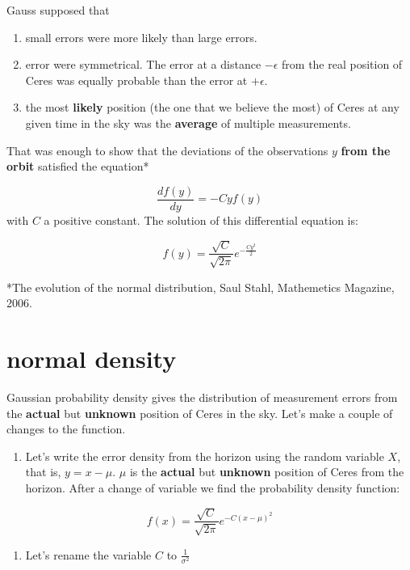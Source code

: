 \documentclass[
]{book}
\providecommand{\tightlist}{%
  \setlength{\itemsep}{0pt}\setlength{\parskip}{0pt}}
\begin{document}
Gauss supposed that

\begin{enumerate}
\def\labelenumi{\arabic{enumi})}
\item
  small errors were more likely than large errors.
\item
  error were symmetrical. The error at a distance \(-\epsilon\) from the real position of Ceres was equally probable than the error at \(+\epsilon\).
\item
  the most \textbf{likely} position (the one that we believe the most) of Ceres at any given time in the sky was the \textbf{average} of multiple measurements.
\end{enumerate}

That was enough to show that the deviations of the observations \(y\) \textbf{from the orbit} satisfied the equation*

\[\frac{df(y)}{dy}=-Cyf(y)\]
with \(C\) a positive constant. The solution of this differential equation is:

\[f(y)=\frac{\sqrt{C}}{\sqrt{2\pi}}e^{-\frac{Cy^2}{2}}\]

*The evolution of the normal distribution, Saul Stahl, Mathemetics Magazine, 2006.

\hypertarget{normal-density}{%
\section{normal density}\label{normal-density}}

Gaussian probability density gives the distribution of measurement errors from the \textbf{actual} but \textbf{unknown} position of Ceres in the sky. Let's make a couple of changes to the function.

\begin{enumerate}
\def\labelenumi{\arabic{enumi})}
\tightlist
\item
  Let's write the error density from the horizon using the random variable \(X\), that is, \(y=x-\mu\). \(\mu\) is the \textbf{actual} but \textbf{unknown} position of Ceres from the horizon. After a change of variable we find the probability density function:
\end{enumerate}

\[f(x)=\frac{\sqrt{C}}{\sqrt{2\pi}}e^{-C(x-\mu)^2}\]

\begin{enumerate}
\def\labelenumi{\arabic{enumi})}
\setcounter{enumi}{1}
\tightlist
\item
  Let's rename the variable \(C\) to \(\frac{1}{\sigma^2}\)
\end{enumerate}
\end{document}

